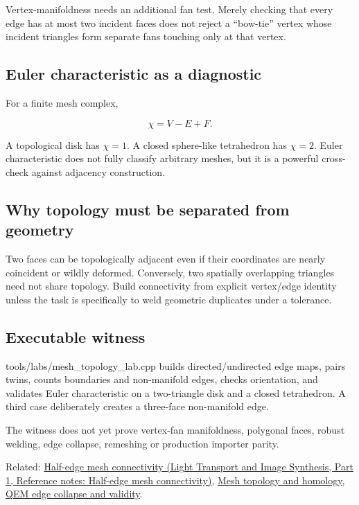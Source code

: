 Vertex-manifoldness needs an additional fan test. Merely checking that every edge has at most two incident faces does not reject a ``bow-tie'' vertex whose incident triangles form separate fans touching only at that vertex.

\subsection{Euler characteristic as a diagnostic}\label{appendix-faac749c9cdd-euler-characteristic-as-a-diagnostic}

\hypertarget{appendix-faac749c9cdd-euler-characteristic-as-a-diagnostic}{}

For a finite mesh complex,

\[
\chi = V-E+F.
\]

A topological disk has \(\chi=1\). A closed sphere-like tetrahedron has \(\chi=2\). Euler characteristic does not fully classify arbitrary meshes, but it is a powerful cross-check against adjacency construction.

\subsection{Why topology must be separated from geometry}\label{appendix-faac749c9cdd-why-topology-must-be-separated-from-geometry}

\hypertarget{appendix-faac749c9cdd-why-topology-must-be-separated-from-geometry}{}

Two faces can be topologically adjacent even if their coordinates are nearly coincident or wildly deformed. Conversely, two spatially overlapping triangles need not share topology. Build connectivity from explicit vertex/edge identity unless the task is specifically to weld geometric duplicates under a tolerance.

\subsection{Executable witness}\label{appendix-faac749c9cdd-executable-witness}

\hypertarget{appendix-faac749c9cdd-executable-witness}{}

tools/labs/mesh\_topology\_lab.cpp builds directed/undirected edge maps, pairs twins, counts boundaries and non-manifold edges, checks orientation, and validates Euler characteristic on a two-triangle disk and a closed tetrahedron. A third case deliberately creates a three-face non-manifold edge.

The witness does not yet prove vertex-fan manifoldness, polygonal faces, robust welding, edge collapse, remeshing or production importer parity.

Related: \href{../04-Light-Transport-and-Image-Synthesis-P01/main.pdf\#nameddest=appendix-1aea26b2307f}{Half-edge mesh connectivity (Light Transport and Image Synthesis, Part 1, Reference notes: Half-edge mesh connectivity)}, \hyperref[appendix-e38976cbbf86]{Mesh topology and homology}, \hyperref[appendix-89db9fe1bc8a]{QEM edge collapse and validity}.
